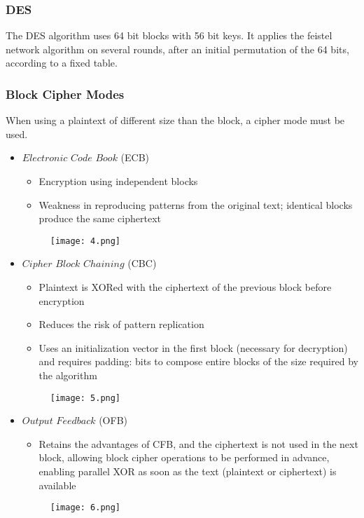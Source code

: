 \documentclass[10pt,a4paper]{report}
\begin{document}
\subsubsection{DES}
The DES algorithm uses 64 bit blocks with 56 bit keys. It applies the feistel network algorithm on several rounds, after an initial permutation of the 64 bits, according to a fixed table.
\subsubsection{Block Cipher Modes}
When using a plaintext of different size than the block, a cipher mode must be used.
\begin{itemize}
\item $Electronic$ $Code$ $Book$ (ECB)
\begin{itemize}
\item Encryption using independent blocks
\item Weakness in reproducing patterns from the original text; identical blocks produce the same ciphertext
\end{itemize}
\begin{figure}[H]
\centering
\texttt{[image: 4.png]}
\end{figure}
\item $Cipher$ $Block$ $Chaining$ (CBC)
\begin{itemize}
\item Plaintext is XORed with the ciphertext of the previous block before encryption
\item Reduces the risk of pattern replication
\item Uses an initialization vector in the first block (necessary for decryption) and requires padding: bits to compose entire blocks of the size required by the algorithm
\end{itemize}
\begin{figure}[H]
\centering
\texttt{[image: 5.png]}
\end{figure}
\item $Output$ $Feedback$ (OFB)
\begin{itemize}
\item Retains the advantages of CFB, and the ciphertext is not used in the next block, allowing block cipher operations to be performed in advance, enabling parallel XOR as soon as the text (plaintext or ciphertext) is available
\end{itemize}
\begin{figure}[H]
\centering
\texttt{[image: 6.png]}

\end{figure}
\end{itemize}
\end{document}
